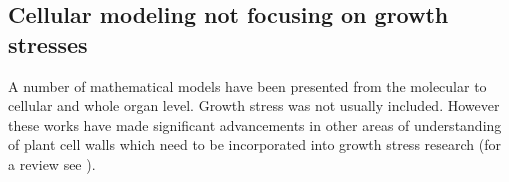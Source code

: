 \subsection{Cellular modeling not focusing on growth stresses}
A number of mathematical models have been presented from the
molecular to cellular and whole organ level. Growth stress was not usually included.
However these works have made significant advancements in other areas of
understanding of plant cell walls which need to be incorporated into growth stress research (for a review see \citet{ISI:000261731700022}).
